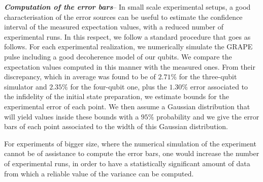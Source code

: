 \documentclass[10pt,nofootinbib,notitlepage,twocolumn,superscriptaddress]{revtex4-1}
\theoremstyle{plain}
\theoremstyle{definition}
\begin{document}
{\it{\bfseries{Computation of the error bars}}}-- In small scale experimental setups, a good characterisation of the error sources can be useful to estimate the confidence interval of the measured expectation values, with a reduced number of experimental runs. In this respect, we follow a standard procedure that goes as follows. For each experimental realization, we numerically simulate the GRAPE pulse including a good decoherence model of our qubits. We compare the expectation values computed in this manner with the measured ones. From their discrepancy, which in average was found to be of $2.71\%$ for the three-qubit simulator and $2.35\%$ for the four-qubit one, plus the $1.30\%$ error associated to the infidelity of the initial state preparation, we estimate bounds for the experimental error of each point.  We then assume a Gaussian distribution that will yield values inside these bounds with a $95\%$ probability and we give the error bars of each point associated to the width of this Gaussian distribution. 

For experiments of bigger size, where the numerical simulation of the experiment cannot be of assistance to compute the error bars, one would increase the number of experimental runs, in order to have a statistically significant amount of data from which a reliable value of the variance can be computed. 
\end{document}
